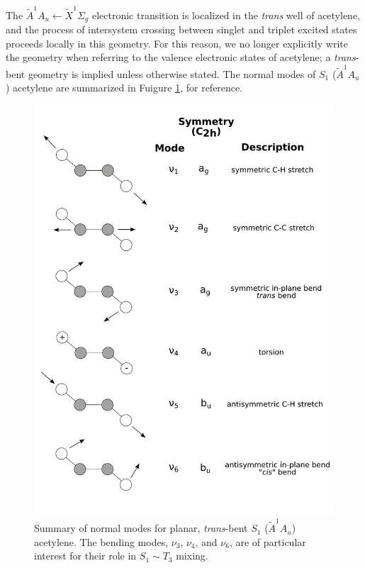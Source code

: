 \documentclass[12pt]{mitthesis}
\begin{document}
The $\tilde{A}^1A_u \leftarrow \tilde{X}^1\Sigma_g$ electronic
transition is localized in the \emph{trans} well of acetylene, and the
process of intersystem crossing between singlet and triplet excited
states proceeds locally in this geometry.  For this reason, we no
longer explicitly write the geometry when referring to the valence
electronic states of acetylene; a \emph{trans}-bent geometry is
implied unless otherwise stated.  The normal modes of $S_1$
($\tilde{A}^1A_u$) acetylene are summarized in Fuigure
\ref{fig:modes}, for reference.

\begin{figure}
  \centering
  \includegraphics[width=5.8in]{s1-modes.pdf}
  \caption{Summary of normal modes for planar, \emph{trans}-bent $S_1$
    ($\tilde{A}^1A_u$) acetylene.  The bending modes, $\nu_3$,
    $\nu_4$, and $\nu_6$, are of particular interest for their role in
    $S_1 \sim T_3$ mixing.}
  \label{fig:modes}
\end{figure} 
\end{document}
